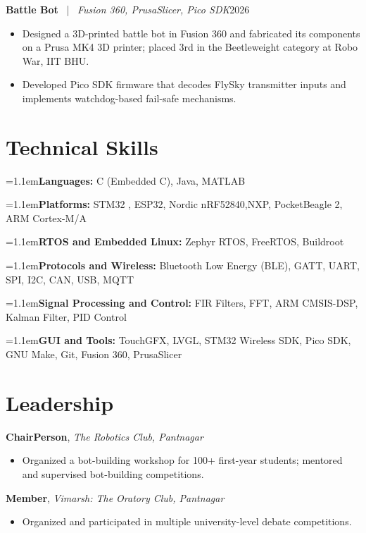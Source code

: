 \documentclass[letterpaper,10pt]{article}
\newcommand{\projhead}[3]{%
  \addvspace{3pt}%
  \noindent\textbf{#1} ~|~ {\small\textit{#2}}\hfill #3\par\nobreak
  \vspace{1pt}}
\newcommand{\entryline}[3]{%
  \addvspace{3pt}%
  \noindent\textbf{#1}, \textit{#2}\hfill #3\par\nobreak
  \vspace{1pt}}
\newcommand{\skillline}[2]{%
  \par\hangindent=1.1em\noindent\textbf{#1:} #2\par\vspace{1.2pt}}
\begin{document}
\projhead
  {Battle Bot}{Fusion 360, PrusaSlicer, Pico SDK}{2026}
\begin{itemize}
  \item Designed a 3D-printed battle bot in Fusion 360 and fabricated its components on a Prusa MK4 3D printer; placed 3rd in the Beetleweight category at Robo War, IIT BHU.
  \item Developed Pico SDK firmware that decodes FlySky transmitter inputs and implements watchdog-based fail-safe mechanisms.
\end{itemize}

\section{Technical Skills}
\vspace{1pt}
\skillline{Languages}{C (Embedded C), Java, MATLAB}
\skillline{Platforms}{STM32 , ESP32, Nordic nRF52840,NXP, PocketBeagle 2, ARM Cortex-M/A}
\skillline{RTOS and Embedded Linux}{Zephyr RTOS, FreeRTOS, Buildroot}
\skillline{Protocols and Wireless}{Bluetooth Low Energy (BLE), GATT, UART, SPI, I2C, CAN, USB, MQTT}
\skillline{Signal Processing and Control}{FIR Filters, FFT, ARM CMSIS-DSP, Kalman Filter, PID Control}
\skillline{GUI and Tools}{TouchGFX, LVGL, STM32 Wireless SDK, Pico SDK, GNU Make, Git, Fusion 360, PrusaSlicer}

\section{Leadership}
\entryline{ChairPerson}{The Robotics Club, Pantnagar}{}%
\begin{itemize}
  \item Organized a bot-building workshop for 100+ first-year students; mentored and supervised bot-building competitions.
\end{itemize}

\entryline{Member}{Vimarsh: The Oratory Club, Pantnagar}{}%
\begin{itemize}
  \item Organized and participated in multiple university-level debate competitions.
\end{itemize}

\end{document}
